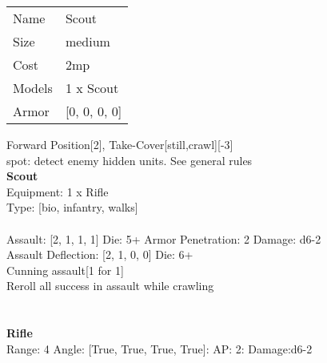 \begin{tabular}{ll}
  Name & Scout \\
  Size & medium\\
  Cost & 2mp\\
  Models & 1 x Scout\\
  Armor & [0, 0, 0, 0]\\
\end{tabular}

\noindent Forward Position[2], Take-Cover[still,crawl][-3]\\ 
spot: detect enemy hidden units. See general rules\\ 


{\bf Scout } \\
Equipment: 1 x Rifle \\
Type: [bio, infantry, walks] \\
\ \\
Assault: [2, 1, 1, 1] Die: 5+ Armor Penetration: 2 Damage: d6-2 \\
Assault Deflection: [2, 1, 0, 0] Die: 6+\\
\indent Cunning assault[1 for 1]\\ 
Reroll all success in assault while crawling\\ 
 
\ \\

\ \\
{\bf Rifle } \\



Range: 4  Angle: [True, True, True, True]: AP: 2: Damage:d6-2 \\




 
\ \\




